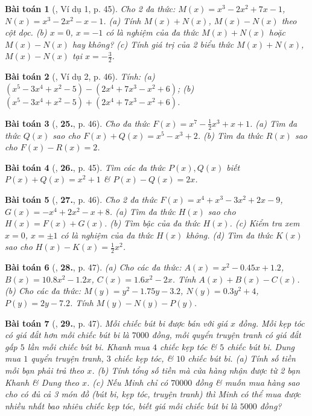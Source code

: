 \documentclass{article}
\numberwithin{equation}{section}
\newtheorem{baitoan}{Bài toán}
\begin{document}
\begin{baitoan}[\cite{SBT_Toan_7_Canh_Dieu_tap_2}, Ví dụ 1, p. 45]
	Cho 2 đa thức: $M(x) =  x^3 - 2x^2 + 7x - 1$, $N(x) = x^3 - 2x^2 - x - 1$. (a) Tính $M(x) + N(x)$, $M(x) - N(x)$ theo cột dọc. (b) $x = 0$, $x = -1$ có là nghiệm của đa thức $M(x) + N(x)$ hoặc $M(x) - N(x)$ hay không? (c) Tính giá trị của 2 biểu thức $M(x) + N(x)$, $M(x) - N(x)$ tại $x = -\frac{3}{2}$.
\end{baitoan}

\begin{baitoan}[\cite{SBT_Toan_7_Canh_Dieu_tap_2}, Ví dụ 2, p. 46]
	Tính: (a) $(x^5 - 3x^4 + x^2 - 5) - (2x^4 + 7x^3 - x^2 + 6)$; (b) $(x^5 - 3x^4 + x^2 - 5) + (2x^4 + 7x^3 - x^2 + 6)$.
\end{baitoan}

\begin{baitoan}[\cite{SBT_Toan_7_Canh_Dieu_tap_2}, \textbf{25.}, p. 46]
	Cho đa thức $F(x) = x^7 - \frac{1}{2}x^3 + x + 1$. (a) Tìm đa thức $Q(x)$ sao cho $F(x) + Q(x) = x^5 - x^3 + 2$. (b) Tìm đa thức $R(x)$ sao cho $F(x) - R(x) = 2$.
\end{baitoan}

\begin{baitoan}[\cite{SBT_Toan_7_Canh_Dieu_tap_2}, \textbf{26.}, p. 45]
	Tìm các đa thức $P(x),Q(x)$ biết $P(x) + Q(x) = x^2 + 1$ \& $P(x) - Q(x) = 2x$.
\end{baitoan}

\begin{baitoan}[\cite{SBT_Toan_7_Canh_Dieu_tap_2}, \textbf{27.}, p. 46]
	Cho 2 đa thức $F(x) = x^4 + x^3 - 3x^2 + 2x - 9$, $G(x) = -x^4 + 2x^2 - x + 8$. (a) Tìm đa thức $H(x)$ sao cho $H(x) = F(x) + G(x)$. (b) Tìm bậc của đa thức $H(x)$. (c) Kiểm tra xem $x = 0$, $x = \pm1$ có là nghiệm của đa thức $H(x)$ không. (d) Tìm đa thức $K(x)$ sao cho $H(x) - K(x) = \frac{1}{2}x^2$.
\end{baitoan}

\begin{baitoan}[\cite{SBT_Toan_7_Canh_Dieu_tap_2}, \textbf{28.}, p. 47]
	(a) Cho các đa thức: $A(x) = x^2 - 0.45x + 1.2$, $B(x) = 10.8x^2 - 1.2x$, $C(x) = 1.6x^2 - 2x$. Tính $A(x) + B(x) - C(x)$. (b) Cho các đa thức: $M(y) = y^2 - 1.75y - 3.2$, $N(y) = 0.3y^2 + 4$, $P(y) = 2y - 7.2$. Tính $M(y) - N(y) - P(y)$.
\end{baitoan}

\begin{baitoan}[\cite{SBT_Toan_7_Canh_Dieu_tap_2}, \textbf{29.}, p. 47]
	Mỗi chiếc bút bi được bán với giá $x$ đồng. Mỗi kẹp tóc có giá đắt hơn mỗi chiếc bút bi là $7000$ đồng, mỗi quyển truyện tranh có giá đắt gấp $5$ lần mỗi chiếc bút bi. Khanh mua $4$ chiếc kẹp tóc \& $5$ chiếc bút bi. Dung mua $1$ quyển truyện tranh, $3$ chiếc kẹp tóc, \& $10$ chiếc bút bi. (a) Tính số tiền mỗi bạn phải trả theo $x$. (b) Tính tổng số tiền mà cửa hàng nhận được từ 2 bạn Khanh \& Dung theo $x$. (c) Nếu Minh chỉ có $70000$ đồng \& muốn mua hàng sao cho có đủ cả 3 món đồ (bút bi, kẹp tóc, truyện tranh) thì Minh có thể mua được nhiều nhất bao nhiêu chiếc kẹp tóc, biết giá mỗi chiếc bút bi là $5000$ đồng?
\end{baitoan}
\end{document}
